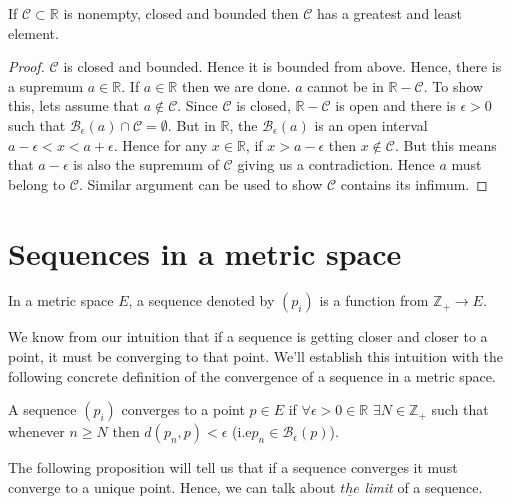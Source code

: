\begin{Theorem}[name=Bounded and closed non-empty sets in $\mathbb{R}$]
    If $\mathcal{C} \subset \mathbb{R}$ is nonempty, closed and bounded then $\mathcal{C}$ has a
    greatest and least element.
\end{Theorem}
\begin{proof}
    $\mathcal{C}$ is closed and bounded. Hence it is bounded from above.  Hence, there is a supremum $a \in \mathbb{R}$. If $a \in \mathbb{R}$ then we are 
    done. $a$ cannot be in $\mathbb{R} - \mathcal{C}$. To show this, lets assume that $a \not \in 
    \mathcal{C}$. Since $\mathcal{C}$ is closed, $\mathbb{R} - \mathcal{C}$ is open and there is 
    $\epsilon > 0$ such that $\mathcal{B}_{\epsilon}(a) \cap \mathcal{C} = \emptyset$. But in 
    $\mathbb{R}$, the $\mathcal{B}_{\epsilon}(a)$ is an open interval $ a - \epsilon < x < a +
    \epsilon $. Hence for any $x \in \mathbb{R}$, if $x > a - \epsilon$ then 
    $x \not \in \mathcal{C}$. But this means that $a - \epsilon$ is also the supremum of 
    $\mathcal{C}$ giving us a contradiction. Hence $a$ must belong to $\mathcal{C}$. 
    Similar argument can be used to show $\mathcal{C}$ contains its infimum.
\end{proof}

\section{Sequences in a metric space}
\begin{Definition}
    In a metric space $E$, a sequence denoted by $\left(p_i\right)$ is a function from $\mathbb{Z}_+
\rightarrow E$.
\end{Definition}
We know from our intuition that if a sequence is getting closer and closer to a point, it must be
converging to that point. We'll establish this intuition with the following concrete definition of
the convergence of a sequence in a metric space.
\begin{Definition}
    A sequence $\left(p_i\right)$ converges to a point $p \in E$ if $\forall \epsilon > 0 \in
    \mathbb{R}$ $\exists N \in \mathbb{Z}_+$ such that whenever $n \geq N$ then $d(p_n,p) <
    \epsilon$ (i.e$p_n \in \mathcal{B}_{\epsilon}(p)$).
\end{Definition}
The following proposition will tell us that if a sequence converges it must converge to a unique
point. Hence, we can talk about $\underline{the}$ \emph{limit} of a sequence.

